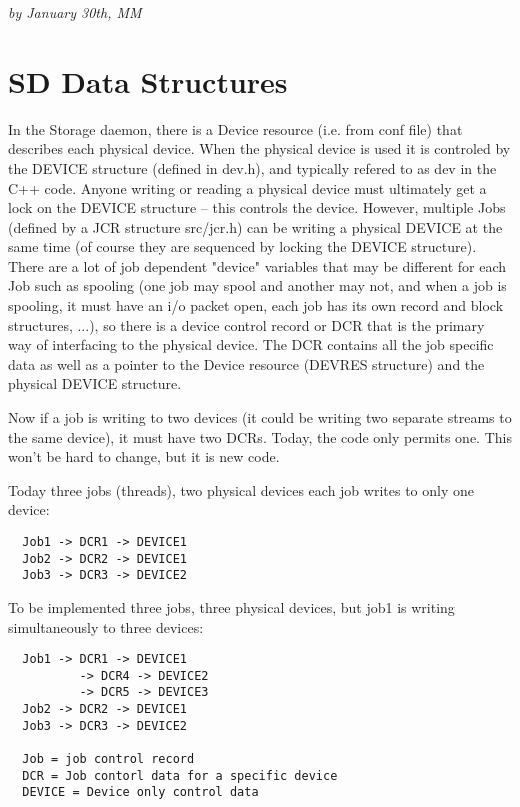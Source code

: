 {\it by 
January 30th, MM } 

\section{SD Data Structures}

In the Storage daemon, there is a Device resource (i.e.  from conf file)
that describes each physical device.  When the physical device is used it
is controled by the DEVICE structure (defined in dev.h), and typically
refered to as dev in the C++ code.  Anyone writing or reading a physical
device must ultimately get a lock on the DEVICE structure -- this controls
the device.  However, multiple Jobs (defined by a JCR structure src/jcr.h)
can be writing a physical DEVICE at the same time (of course they are
sequenced by locking the DEVICE structure).  There are a lot of job
dependent "device" variables that may be different for each Job such as
spooling (one job may spool and another may not, and when a job is
spooling, it must have an i/o packet open, each job has its own record and
block structures, ...), so there is a device control record or DCR that is
the primary way of interfacing to the physical device.  The DCR contains
all the job specific data as well as a pointer to the Device resource
(DEVRES structure) and the physical DEVICE structure.

Now if a job is writing to two devices (it could be writing two separate 
streams to the same device), it must have two DCRs.  Today, the code only 
permits one.  This won't be hard to change, but it is new code.

Today three jobs (threads), two physical devices each job
   writes to only one device:

\begin{verbatim}
  Job1 -> DCR1 -> DEVICE1
  Job2 -> DCR2 -> DEVICE1
  Job3 -> DCR3 -> DEVICE2
\end{verbatim}

To be implemented three jobs, three physical devices, but
    job1 is writing simultaneously to three devices:

\begin{verbatim}
  Job1 -> DCR1 -> DEVICE1
          -> DCR4 -> DEVICE2
          -> DCR5 -> DEVICE3
  Job2 -> DCR2 -> DEVICE1
  Job3 -> DCR3 -> DEVICE2

  Job = job control record
  DCR = Job contorl data for a specific device
  DEVICE = Device only control data
\end{verbatim}

